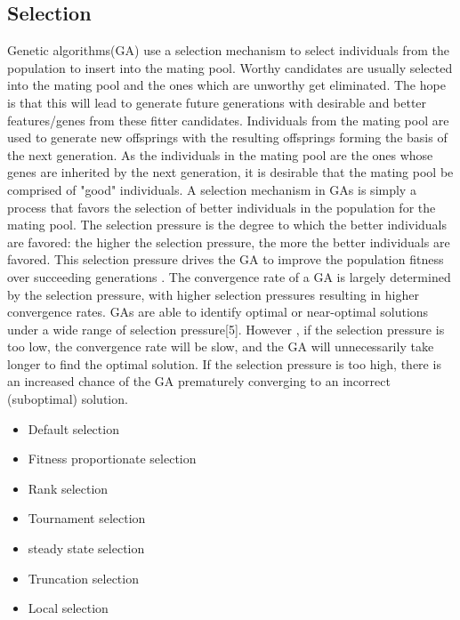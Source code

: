 \documentclass[a4paper, 12pt]{article}
\begin{document}
\subsection{Selection}
Genetic algorithms(GA) use a selection mechanism to select individuals from the population to insert into the mating pool. Worthy candidates are usually selected into the mating pool and the ones which are unworthy get eliminated. The hope is that this will lead to generate future generations with desirable and better features/genes from these fitter candidates. Individuals from the mating pool are used to generate new offsprings with the resulting offsprings forming the basis of the next generation. As the individuals in the mating pool are the ones whose genes are inherited by the next generation, it is desirable that the mating pool be comprised of "good" individuals. A selection mechanism in GAs is simply a process that favors the selection of better individuals in the population for the mating pool. 
The selection pressure is the degree to which the better individuals are favored: the higher the selection pressure, the more the better
individuals are favored. This selection pressure drives the GA to improve the population fitness over succeeding generations . The convergence
rate of a GA is largely determined by the selection pressure, with higher selection pressures resulting in higher convergence rates. GAs are 
able to identify optimal or near-optimal solutions under a wide range of selection pressure[5]. However , if the selection pressure is too low, the convergence rate will be slow, and the GA will unnecessarily take longer to find the optimal solution. If the selection pressure is too 
high, there is an increased chance of the GA prematurely converging to an incorrect (suboptimal) solution.
\begin{itemize}
\item Default selection
\item Fitness proportionate selection
\item Rank selection
\item Tournament selection
\item steady state selection
\item Truncation selection
\item Local selection
\end{itemize}
\newpage
\end{document}
